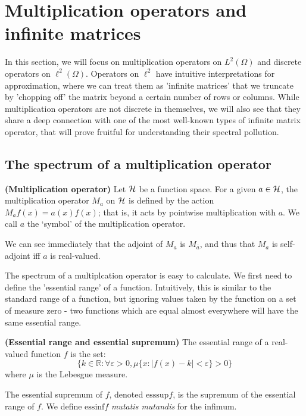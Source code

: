 \documentclass[../main.tex]{subfiles}
\begin{document}
\section{Multiplication operators and infinite matrices}
In this section, we will focus on multiplication operators on $L^2(\Omega)$ and
discrete operators on $\ell^2(\Omega)$. Operators on $\ell^2$ have intuitive
interpretations for approximation, where we can treat them as 'infinite
matrices' that we truncate by 'chopping off' the matrix beyond a certain number
of rows or columns. While multiplication operators are not discrete in
themselves, we will also see that they share a deep connection with one of the
most well-known types of infinite matrix operator, that will prove fruitful for
understanding their spectral pollution.

\subsection{The spectrum of a multiplication operator}
\begin{definition}{\textbf{(Multiplication operator)}}
Let $\mathcal{H}$ be a function space. For a given $a \in \mathcal{H}$, the
multiplication operator $M_a$ on $\mathcal{H}$ is defined by the action
$M_af(x) = a(x)f(x)$; that is, it acts by pointwise multiplication with
$a$. We call $a$ the `symbol' of the multiplication operator.
\end{definition}

We can see immediately that the adjoint of $M_a$ is $M_{\overline{a}}$, and thus
that $M_a$ is self-adjoint iff $a$ is real-valued.

The spectrum of a multiplcation operator is easy to calculate. We first
need to define the 'essential range' of a function. Intuitively, this is
similar to the standard range of a function, but ignoring values taken by
the function on a set of measure zero - two functions which are equal
almost everywhere will have the same essential range.

\begin{definition}{\textbf{(Essential range and essential supremum)}}
\label{defn:essential-range}
The essential range of a real-valued function $f$ is the set:
 $$\{k \in \mathbb{R} : \forall \varepsilon > 0, \mu\{x : |f(x) - k| < \varepsilon\} > 0\}$$
where $\mu$ is the Lebesgue measure.
  
The essential supremum of $f$, denoted $\mathrm{esssup}f$, is the supremum of
the essential range of $f$. We define $\mathrm{essinf}f$ \emph{mutatis
mutandis} for the infimum.
\end{definition}
\end{document}
